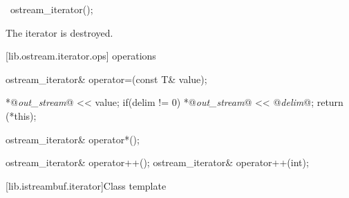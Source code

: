 %
\begin{itemdecl}
~ostream_iterator();
\end{itemdecl}

\begin{itemdescr}
\pnum
\effects
The iterator is destroyed.
\end{itemdescr}

[lib.ostream.iterator.ops]{ operations}

%
%
\begin{itemdecl}
ostream_iterator& operator=(const T& value);
\end{itemdecl}

\begin{itemdescr}
\pnum
\effects
\begin{codeblock}
  *@\textit{out_stream}@ << value;
  if(delim != 0) *@\textit{out_stream}@ << @\textit{delim}@;
  return (*this);
\end{codeblock}
\end{itemdescr}

%
%
\begin{itemdecl}
ostream_iterator& operator*();
\end{itemdecl}

\begin{itemdescr}
\pnum
\returns
{}
\end{itemdescr}

%
%
\begin{itemdecl}
ostream_iterator& operator++();
ostream_iterator& operator++(int);
\end{itemdecl}

\begin{itemdescr}
\pnum
\returns
{}
\end{itemdescr}

[lib.istreambuf.iterator]{Class template }

